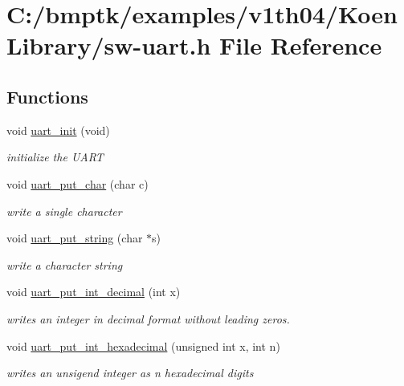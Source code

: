 \hypertarget{sw-uart_8h}{}\section{C\+:/bmptk/examples/v1th04/\+Koen\+Library/sw-\/uart.h File Reference}
\label{sw-uart_8h}
\subsection*{Functions}
\begin{DoxyCompactItemize}
\item 
void \hyperlink{sw-uart_8h_a0c0ca72359ddf28dcd15900dfba19343}{uart\+\_\+init} (void)
\begin{DoxyCompactList}\small\item\em initialize the U\+A\+R\+T \end{DoxyCompactList}\item 
void \hyperlink{sw-uart_8h_a360a5c07525e327a80e6e11602832292}{uart\+\_\+put\+\_\+char} (char c)
\begin{DoxyCompactList}\small\item\em write a single character \end{DoxyCompactList}\item 
void \hyperlink{sw-uart_8h_a83d7ce6de1ab92205be5abf28e05130b}{uart\+\_\+put\+\_\+string} (char $\ast$s)
\begin{DoxyCompactList}\small\item\em write a character string \end{DoxyCompactList}\item 
void \hyperlink{sw-uart_8h_a0a34aabcb67f5524a6d4d4235139da6b}{uart\+\_\+put\+\_\+int\+\_\+decimal} (int x)
\begin{DoxyCompactList}\small\item\em writes an integer in decimal format without leading zero\textquotesingle{}s. \end{DoxyCompactList}\item 
void \hyperlink{sw-uart_8h_aaf97260d62f356f699fb3f779b07566b}{uart\+\_\+put\+\_\+int\+\_\+hexadecimal} (unsigned int x, int n)
\begin{DoxyCompactList}\small\item\em writes an unsigend integer as n hexadecimal digits \end{DoxyCompactList}\end{DoxyCompactItemize}


